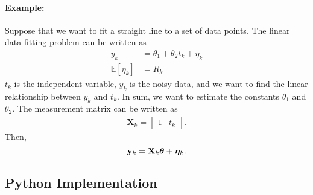 \paragraph{Example:} Suppose that we want to fit a straight line to a set of data points. The linear data fitting problem can be written as 
\begin{align*}
	y_k &= \theta_1+\theta_2t_k+\eta_k\\
	\mathbb{E}[\eta_k] &= R_k
\end{align*}
$t_k$ is the independent variable, $y_k$ is the noisy data, and we want to find the linear relationship between $y_k$ and $t_k$. In sum, we want to estimate the constants $\theta_1$ and $\theta_2$. The measurement matrix can be written as 
\begin{align*}
	\mathbf{X}_k = \begin{bmatrix}
		1 & t_k
	\end{bmatrix}.
\end{align*}
Then, 
$${\mathbf{y}}_k = \mathbf{X}_k\boldsymbol{\theta}+\boldsymbol{\eta}_k.$$


\subsection{Python Implementation}

